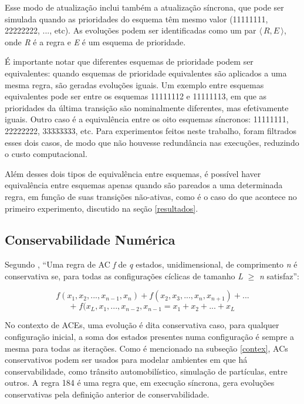 \documentclass[a4paper,12pt]{ltxdoc}
\newcommand\tab[1][1cm]{\hspace*{#1}}
\begin{document}
\tab Esse modo de atualização inclui também a atualização síncrona, que pode ser simulada quando as prioridades do esquema têm mesmo valor (11111111, 22222222, ..., etc). As evoluções podem ser identificadas como um par $\langle\,R,E\,\rangle$, onde \textit{R} é a regra e \textit{E} é um esquema de prioridade. 

\tab É importante notar que diferentes esquemas de prioridade podem ser equivalentes: quando esquemas de prioridade equivalentes são aplicados a uma mesma regra, são geradas evoluções iguais. Um exemplo entre esquemas equivalentes pode ser entre os esquemas 11111112 e 11111113, em que as prioridades da última transição são nominalmente diferentes, mas efetivamente iguais. Outro caso é a equivalência entre os oito esquemas síncronos: 11111111, 22222222, 33333333, etc. Para experimentos feitos neste trabalho, foram filtrados esses dois casos, de modo que não houvesse redundância nas execuções, reduzindo o custo computacional.

\tab Além desses dois tipos de equivalência entre esquemas, é possível haver equivalência entre esquemas apenas quando são pareados a uma determinada regra, em função de suas transições não-ativas, como é o caso do que acontece no primeiro experimento, discutido na seção \ref{resultados}.


\subsection{Conservabilidade Numérica} \label{num-conserv}
Segundo \cite{boccara2002number}, ``Uma regra de AC \textit{f} de \textit{q} estados, unidimensional, de comprimento \textit{n} é conservativa se, para todas as configurações cíclicas de tamanho \textit{L} \(\geq\) \textit{n} satisfaz'':

\[f(x_1,x_2,...,x_{n-1},x_n) + f(x_2,x_3,...,x_n,x_{n+1}) + ... \]
\[ + \;   f(x_L,x_1,...,x_{n-2},x_{n-1} = x_1 + x_2 + ... + x_L\] 

\tab No contexto de ACEs, uma evolução é dita conservativa caso, para qualquer configuração inicial, a soma dos estados presentes numa configuração é sempre a mesma para todas as iterações. Como é mencionado na subseção \ref{contex}, ACs conservativos podem ser usados para modelar ambientes em que há conservabilidade, como trânsito automobilístico, simulação de partículas, entre outros. A regra 184 é uma regra que, em execução síncrona, gera evoluções conservativas pela definição anterior de conservabilidade. 
\end{document}
